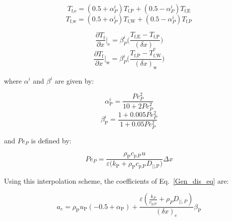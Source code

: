 \documentclass[review,preprint,12pt]{elsarticle}
\begin{document}
\begin{equation}
T_\textrm{f,e}= (0.5+\alpha^{i}_P)T_\textrm{f,P}+(0.5-\alpha^{i}_P)T_\textrm{f,E}
\end{equation}
\begin{equation}
T_\textrm{f,w}= (0.5+\alpha^{i}_P)T_\textrm{f,W}+(0.5-\alpha^{i}_P)T_\textrm{f,P}
\end{equation}

\begin{equation}
\frac{\partial T_\textrm{f}}{\partial x}\bigg|_\textrm{e} = \beta^{i}_P\Biggl(\frac{T_\textrm{f,E}-T_\textrm{f,P}}{(\delta x)_\textrm{e}} \Biggr)
\end{equation}
\begin{equation}
\frac{\partial T_\textrm{f}}{\partial x}\bigg|_\textrm{w} = \beta^{i}_P\Biggl(\frac{T_\textrm{f,P}-T_\textrm{f,W}}{(\delta x)_\textrm{w}} \Biggr)
\end{equation}

\noindent where $\alpha^{i}$ and $\beta^{i}$ are given by:

\begin{equation}
\alpha^{i}_\textrm{P} = \frac{Pe_P^2}{10+2Pe_P^2}
\label{WUDS_alpha}
\end{equation}
\begin{equation}
\beta^{i}_\textrm{P} = \frac{1+0.005Pe_P^2}{1+0.05Pe_P^2}
\label{WUDS_beta}
\end{equation}

\noindent and $Pe_P$ is defined by:

\begin{equation}
Pe_P = \frac{\rho_\textrm{P}c_\textrm{p,P}u}{\varepsilon\bigl(k_\textrm{P} + \rho_\textrm{P} c_\textrm{p,P}D_\textrm{||,P}\bigr)} \Delta x
\label{WUDS_Pe}
\end{equation}

Using this interpolation scheme, the coefficients of Eq.~\eqref{Gen_dis_eq} are: 


$$
a_e= \rho_\textrm{P} u_\textrm{P} (-0.5+\alpha_\textrm{P}) +\frac{\varepsilon (\frac{k_P}{c_\textrm{p,P}}+\rho_P D_{||,P})}{(\delta x)_e}\beta_\textrm{P}
$$
\end{document}
